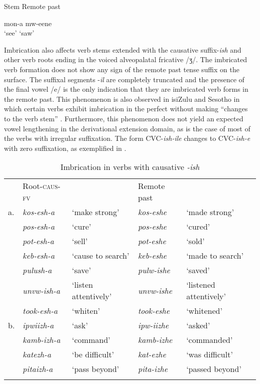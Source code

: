 \documentclass[output=paper]{langsci/langscibook}
\begin{document}
\ea
\label{ex:8.kawasha}
   Stem  Remote past

\gll    mon-a  mw-eene  \\
‘see’  ‘saw’ \\
\z

Imbrication also affects verb stems extended with the causative suffix-\textit{ish} and other verb roots ending in the voiced alveopalatal fricative /ʒ/. The imbricated verb formation does not show any sign of the remote past tense suffix on the surface. The suffixal segments -\textit{il} are completely truncated and the presence of the final vowel /e/ is the only indication that they are imbricated verb forms in the remote past. This phenomenon is also observed in isiZulu and Sesotho in which certain verbs exhibit imbrication in the perfect without making “changes to the verb stem” \citep{monich2015}. Furthermore, this phenomenon does not yield an expected vowel lengthening in the derivational extension domain, as is the case of most of the verbs with irregular suffixation. The form CVC-\textit{ish-ile} changes to CVC-\textit{ish-e} with zero suffixation, as exemplified in .

\begin{table}
\begin{tabular}{lllll}
\lsptoprule
 & Root-\textsc{caus}-\textsc{fv} &  & Remote past & \\
a. & \textit{kos-esh-a} & `make strong' & \textit{kos-eshe} & `made strong' \\
 & \textit{pos-esh-a} & `cure' & \textit{pos-eshe} & `cured' \\
 & \textit{pot-esh-a} & `sell' & \textit{pot-eshe} & `sold' \\
 & \textit{keb-esh-a} & `cause to search' & \textit{keb-eshe} & `made to search' \\
 & \textit{pulush-a} & `save' & \textit{pulw-ishe} & `saved' \\
 & \textit{unvw-ish-a} & `listen attentively' & \textit{unvw-ishe} & `listened attentively' \\
 & \textit{took-esh-a} & `whiten' & \textit{took-eshe} & `whitened' \\

b. & \textit{ipwiizh-a} & `ask' & \textit{ipw-iizhe} & `asked' \\
 & \textit{kamb-izh-a} & `command' & \textit{kamb-izhe} & `commanded' \\
 & \textit{katezh-a} & `be difficult' & \textit{kat-ezhe} & `was difficult' \\
 & \textit{pitaizh-a} & `pass beyond' & \textit{pita-izhe} & `passed beyond' \\

\lspbottomrule
\end{tabular}

\caption{Imbrication in verbs with causative \textit{-ish}}
\label{tab:24.kawasha}

\end{table}
\end{document}
